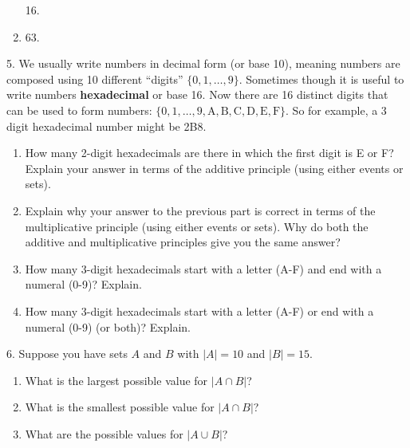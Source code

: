 \documentclass[10pt,]{book}
\newcommand{\terminology}[1]{\textbf{#1}}
\theoremstyle{plain}
\theoremstyle{definition}
\theoremstyle{definition}
\theoremstyle{definition}
\theoremstyle{definition}
\numberwithin{equation}{chapter}
\newcommand{\card}[1]{\left| #1 \right|}
\begin{document}
\begin{exerciselist}
\begin{enumerate}[label=(\alph*)]
16.%
\item\hypertarget{li-342}{}\hypertarget{p-757}{}%
63.%
\end{enumerate}
%
\par\smallskip
\item[5.]\hypertarget{exercise-88}{}\hypertarget{p-761}{}%
We usually write numbers in decimal form (or base 10), meaning numbers are composed using 10 different ``digits'' \(\{0,1,\ldots, 9\}\). Sometimes though it is useful to write numbers \terminology{hexadecimal} or base 16. Now there are 16 distinct digits that can be used to form numbers: \(\{0, 1, \ldots, 9, \mathrm{A, B, C, D, E, F}\}\). So for example, a 3 digit hexadecimal number might be 2B8. \leavevmode%
\begin{enumerate}[label=(\alph*)]
\item\hypertarget{li-345}{}\hypertarget{p-762}{}%
How many 2-digit hexadecimals are there in which the first digit is E or F? Explain your answer in terms of the additive principle (using either events or sets). %
\item\hypertarget{li-346}{}\hypertarget{p-763}{}%
Explain why your answer to the previous part is correct in terms of the multiplicative principle (using either events or sets). Why do both the additive and multiplicative principles give you the same answer? %
\item\hypertarget{li-347}{}\hypertarget{p-764}{}%
How many 3-digit hexadecimals start with a letter (A-F) and end with a numeral (0-9)? Explain. %
\item\hypertarget{li-348}{}\hypertarget{p-765}{}%
How many 3-digit hexadecimals start with a letter (A-F) or end with a numeral (0-9) (or both)? Explain. %
\end{enumerate}
%
\par\smallskip
\item[6.]\hypertarget{exercise-89}{}\hypertarget{p-766}{}%
Suppose you have sets \(A\) and \(B\) with \(\card{A} = 10\) and \(\card{B} = 15\). \leavevmode%
\begin{enumerate}[label=(\alph*)]
\item\hypertarget{li-349}{}What is the largest possible value for \(\card{A \cap B}\)?%
\item\hypertarget{li-350}{}What is the smallest possible value for \(\card{A \cap B}\)?%
\item\hypertarget{li-351}{}What are the possible values for \(\card{A \cup B}\)?%
\end{enumerate}
%
\par\smallskip

\end{exerciselist}
\end{document}
